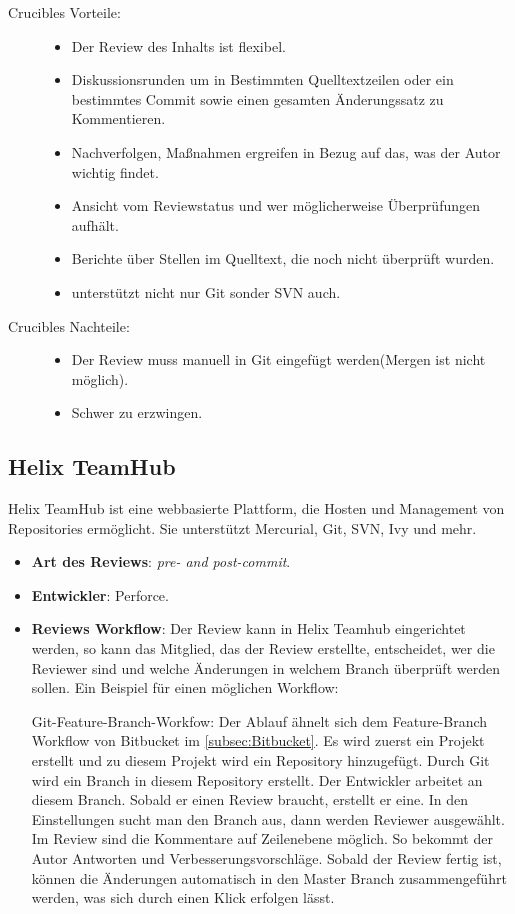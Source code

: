 \begin{description}
	\item [Crucibles Vorteile:] \hfill
	\begin{itemize}
		\item Der Review des Inhalts ist flexibel.
		\item Diskussionsrunden um in Bestimmten Quelltextzeilen oder ein bestimmtes Commit sowie einen gesamten Änderungssatz zu Kommentieren.
		\item Nachverfolgen, Maßnahmen ergreifen in Bezug auf das, was der Autor wichtig findet.
		\item Ansicht vom Reviewstatus und wer möglicherweise Überprüfungen aufhält.
		\item Berichte über Stellen im Quelltext, die noch nicht überprüft wurden.
		\item unterstützt nicht nur Git sonder \ac{SVN} auch.
	\end{itemize}
	
	\item [Crucibles Nachteile:] \hfill
	\begin{itemize}
		\item Der Review muss manuell in Git eingefügt werden(Mergen ist nicht möglich).
		\item Schwer zu erzwingen.
	\end{itemize}
\end{description}

\subsection{Helix TeamHub}
\label{subsec:HelixTeamHub}

Helix TeamHub ist eine webbasierte Plattform, die Hosten und Management von Repositories ermöglicht. Sie unterstützt Mercurial, Git, \ac{SVN}, Ivy und mehr.

\begin{itemize}
	\item \textbf{Art des Reviews}: \textit{pre- and post-commit}.
	\item \textbf{Entwickler}: Perforce. 
	\item \textbf{Reviews Workflow}: Der Review kann in Helix Teamhub eingerichtet werden, so kann das Mitglied, das der Review erstellte, entscheidet, wer die Reviewer
		 sind und welche Änderungen in welchem Branch überprüft werden sollen.
		 Ein Beispiel für einen möglichen Workflow:
		 
		  Git-Feature-Branch-Workfow: Der Ablauf ähnelt sich dem Feature-Branch Workflow von Bitbucket im \cref{subsec:Bitbucket}.
		  Es wird zuerst ein Projekt erstellt und zu diesem Projekt wird ein Repository hinzugefügt. Durch Git wird ein Branch in diesem Repository
		  erstellt. Der Entwickler arbeitet an diesem Branch. Sobald er einen Review braucht, erstellt er eine. In den Einstellungen sucht man den Branch aus, dann werden Reviewer
		  ausgewählt. Im Review sind die Kommentare auf Zeilenebene möglich. So bekommt der Autor Antworten und Verbesserungsvorschläge. Sobald der Review fertig ist,
		  können die Änderungen automatisch in den Master Branch zusammengeführt werden, was sich durch einen Klick erfolgen lässt. 
\end{itemize}

